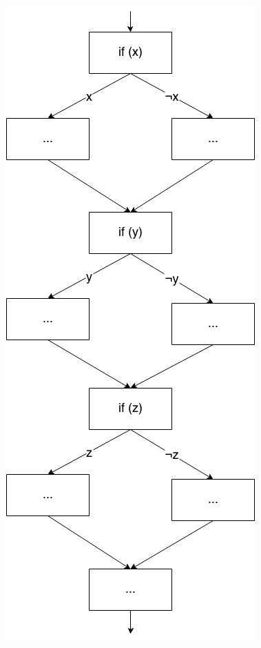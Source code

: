 \documentclass[french]{article}
\begin{document}
  \begin{minipage}[r]{.45\linewidth}
    \includegraphics[scale=0.4]{./pictures/if_3seq.png}
  \end{minipage}

\end{document}
